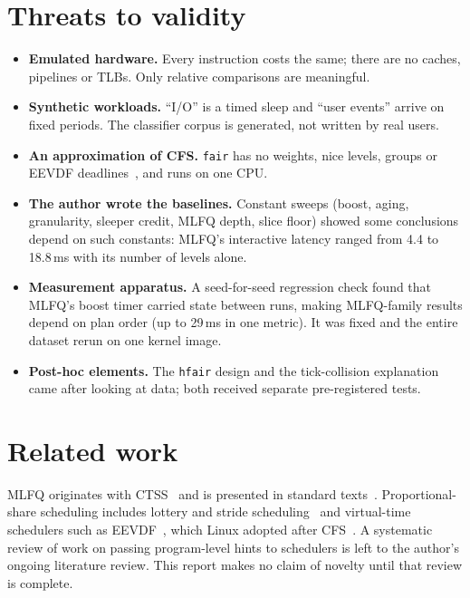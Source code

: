 \documentclass[10pt,twocolumn]{article}
\newcommand{\ms}{\,ms}
\newcommand{\pol}[1]{\texttt{#1}}
\begin{document}
\section{Threats to validity}\label{sec:threats}
\begin{itemize}\setlength\itemsep{1pt}
\item \textbf{Emulated hardware.} Every instruction costs the same; there are no caches,
pipelines or TLBs. Only relative comparisons are meaningful.
\item \textbf{Synthetic workloads.} ``I/O'' is a timed sleep and ``user events'' arrive on
fixed periods. The classifier corpus is generated, not written by real users.
\item \textbf{An approximation of CFS.} \pol{fair} has no weights, nice levels, groups or
EEVDF deadlines~\cite{eevdf}, and runs on one CPU.
\item \textbf{The author wrote the baselines.} Constant sweeps (boost, aging, granularity,
sleeper credit, MLFQ depth, slice floor) showed some conclusions depend on such constants:
MLFQ's interactive latency ranged from 4.4 to 18.8\ms{} with its number of levels alone.
\item \textbf{Measurement apparatus.} A seed-for-seed regression check found that MLFQ's
boost timer carried state between runs, making MLFQ-family results depend on plan order (up
to 29\ms{} in one metric). It was fixed and the entire dataset rerun on one kernel image.
\item \textbf{Post-hoc elements.} The \pol{hfair} design and the tick-collision explanation
came after looking at data; both received separate pre-registered tests.
\end{itemize}

\section{Related work}
MLFQ originates with CTSS~\cite{corbato62} and is presented in standard texts~\cite{ostep}.
Proportional-share scheduling includes lottery and stride scheduling~\cite{lottery} and
virtual-time schedulers such as EEVDF~\cite{eevdf}, which Linux adopted after
CFS~\cite{cfs}. A systematic review of work on passing program-level hints to schedulers is
left to the author's ongoing literature review. This report makes no claim of novelty
until that review is complete.
\end{document}
